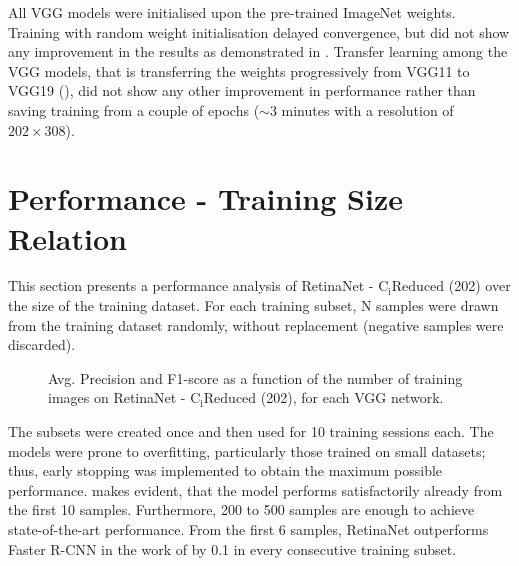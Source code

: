 All VGG models were initialised upon the pre-trained ImageNet weights. Training with random weight initialisation delayed convergence, but did not show any improvement in the results as demonstrated in \cite{bargoti2017deep}. Transfer learning among the VGG models, that is transferring the weights progressively from VGG11 to VGG19 (\cite{simonyan2014very}), did not show any other improvement in performance rather than saving training from a couple of epochs ($\sim3$ minutes with a resolution of $202\times308$).


\section{Performance - Training Size Relation}

This section presents a performance analysis of RetinaNet - $\text{C}_\text{i}\text{Reduced}$ (202)	over the size of the training dataset. For each training subset, N samples were drawn from the training dataset randomly, without replacement (negative samples were discarded). 

 \begin{figure}[!htb]
  \centering
  \caption{Avg. Precision and F1-score as a function of the number of training images on RetinaNet - $\text{C}_\text{i}\text{Reduced}$ (202), for each VGG network.}
  \label{fig3}
\end{figure}

The subsets were created once and then used for 10 training sessions each. The models were prone to overfitting, particularly those trained on small datasets; thus, early stopping was implemented to obtain the maximum possible performance.  makes evident, that the model performs satisfactorily already from the first 10 samples. Furthermore, 200 to 500 samples are enough to achieve state-of-the-art performance. From the first 6 samples, RetinaNet outperforms Faster R-CNN in the work of \cite{bargoti2017deep} by 0.1 in every consecutive training subset.



